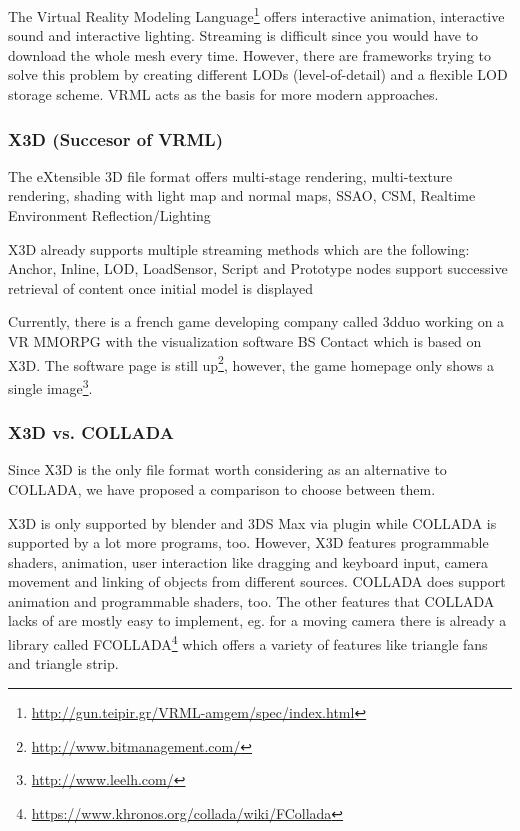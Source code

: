 \documentclass[%
aip,
jmp,
amsmath,amssymb,
reprint,
nofootinbib
]{revtex4-1}
\begin{document}
	The Virtual Reality Modeling Language\footnote{\url{http://gun.teipir.gr/VRML-amgem/spec/index.html}} offers interactive animation, interactive sound and interactive lighting. Streaming is difficult since you would have to download the whole mesh every time. However, there are frameworks trying to solve this problem by creating different LODs (level-of-detail) and a flexible LOD storage scheme. VRML acts as the basis for more modern approaches.
	
	\subsubsection{X3D (Succesor of VRML)}
	
	The eXtensible 3D file format offers multi-stage rendering, multi-texture rendering, shading with light map and normal maps, SSAO, CSM, Realtime Environment Reflection/Lighting
	
	X3D already supports multiple streaming methods which are the following: Anchor, Inline, LOD, LoadSensor, Script and Prototype nodes support successive retrieval of content once initial model is displayed
	
	Currently, there is a french game developing company called 3dduo working on a VR MMORPG with the visualization software BS Contact which is based on X3D. The software page is still up\footnote{\url{http://www.bitmanagement.com/}}, however, the game homepage only shows a single image\footnote{\url{http://www.leelh.com/}}.
	
	\subsubsection{X3D vs. COLLADA}
	
	Since X3D is the only file format worth considering as an alternative to COLLADA, we have proposed a comparison to choose between them. 
	
	X3D is only supported by blender and 3DS Max via plugin while COLLADA is supported by a lot more programs, too. However, X3D features programmable shaders, animation, user interaction like dragging and keyboard input, camera movement and linking of objects from different sources. COLLADA does support animation and programmable shaders, too. The other features that COLLADA lacks of are mostly easy to implement, eg. for a moving camera there is already a library called FCOLLADA\footnote{\url{https://www.khronos.org/collada/wiki/FCollada}} which offers a variety of features like triangle fans and triangle strip.
	
\end{document}
